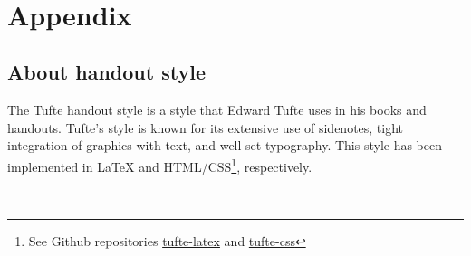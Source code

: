 \documentclass[a4paper]{tufte-handout}
\begin{document}
　

\hypertarget{appendix}{%
\section{Appendix}\label{appendix}}

\hypertarget{about-handout-style}{%
\subsection{About handout style}\label{about-handout-style}}

The Tufte handout style is a style that Edward Tufte uses in his books
and handouts. Tufte's style is known for its extensive use of sidenotes,
tight integration of graphics with text, and well-set typography. This
style has been implemented in LaTeX and HTML/CSS\footnote{See Github
  repositories
  \href{https://github.com/tufte-latex/tufte-latex}{tufte-latex} and
  \href{https://github.com/edwardtufte/tufte-css}{tufte-css}},
respectively.

　


\end{document}
